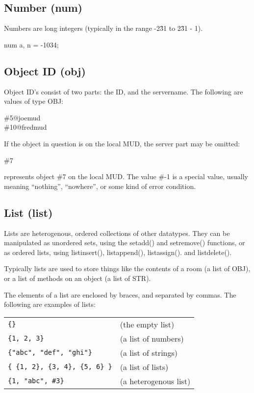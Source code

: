 \subsection{Number ({\bf num})}

Numbers are long integers (typically in the range -2\^31 to 2\^31 - 1).
\begin{code}
num  a, n = -1034;
\end{code}

\subsection{Object ID ({\bf obj})}

Object ID's consist of two parts:  the ID, and the servername.
The following are values of type OBJ:
\begin{code}
\#5@joemud \\
\#10@fredmud
\end{code}
If the object in question is on the local MUD, the server part may
be omitted:
\begin{code}
\#7
\end{code}
represents object \#7 on the local MUD.  The value \#-1 is a special
value, usually meaning ``nothing'', ``nowhere'', or some kind of error
condition.

\subsection{List ({\bf list})}

Lists are heterogenous, ordered collections of other datatypes.
They can be manipulated as unordered sets, using the setadd() and
setremove() functions, or as ordered lists, using listinsert(),
listappend(), listassign().  and listdelete().

Typically lists are used to store things like the contents of a
room (a list of OBJ), or a list of methods on an object (a list
of STR).

The elements of a list are enclosed by braces, and separated by commas.
The following are examples of lists:

\begin{tabular}{ll}
\verb+{}+			 &	(the empty list) \\
\verb+{1, 2, 3}+		 &	(a list of numbers)	 \\
\verb+{"abc", "def", "ghi"}+ 	 & 	(a list of strings)	\\
\verb+{ {1, 2}, {3, 4}, {5, 6} }+ &	(a list of lists) \\
\verb+{1, "abc", #3}+ &			(a heterogenous list) \\
\end{tabular}

